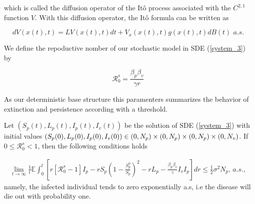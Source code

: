 which is called the diffusion operator of the It\^{o} process associated with the $C^{2,1}$ function $V$. With this diffusion operator, the It\^{o} formula can be written as

\begin{equation}\label{Itoformula}
dV(x(t),t) = LV(x(t),t)dt+V_x(x(t),t)g(x(t),t)dB(t)\,\,a.s.
\end{equation}

We define the repoductive nomber of our stochastic model in SDE (\ref{system_3}) by

\begin{equation}\label{eq5}
	\mathcal{R}_0^s=\frac{\beta_p\beta_v}{\gamma r}
\end{equation}

As our deterministic base structure this paramenters summarizes the behavior of 
extinction and persistence according with a threshold.

\begin{theorem}\label{theorem_2}
	Let $(S_p(t),L_p(t),I_p(t),I_v(t))$ be the solution of SDE (\ref{system_3}) with initial values $(S_p(0),L_p(0),I_p(0),I_v(0))\in (0,N_p)\times(0,N_p)\times(0,N_p)\\\times(0,N_v)$. If $0\leq \mathcal{R}^s_0<1$, then the following conditions holds

	\begin{align*}
		\lim\limits_{t\rightarrow \infty}\frac{1}{t}\mathbb{E}\int_{0}^{t}\left[{r[\mathcal{R}^s_0-1]I_p-rS_p\left(1-\frac{S^0_p}{S_p}\right)^2-rL_p-\frac{\beta_p\beta_v}{\gamma}I_vI_p}\right]dr\leq \frac{1}{2}\sigma^2N_p,\, a.s.,
	\end{align*}
	namely, the infected individual tends to zero exponentially a.s, i.e the disease will die out with probability one.
\end{theorem}

